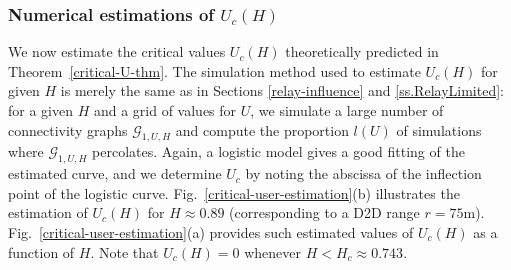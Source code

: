 \documentclass[conference]{IEEEtran}
\begin{document}
\vspace{1\baselineskip}

\subsubsection{Numerical estimations of $U_c(H)$}
We now estimate the critical values $U_c(H)$ theoretically predicted in Theorem~\ref{critical-U-thm}.
The simulation method used to estimate $U_{c}(H)$ for given $H$ is merely the same as in Sections \ref{relay-influence} and \ref{ss.RelayLimited}: for a given $H$ and a grid of values for $U$, we simulate a large number of connectivity graphs $\mathcal{G}_{1,U,H}$ and compute the proportion $l(U)$ of simulations where $\mathcal{G}_{1,U,H}$ percolates. Again, a logistic model gives a good fitting of the estimated curve, and we determine $U_{c}$ by noting the abscissa of the inflection point of the logistic curve. Fig.~\ref{critical-user-estimation}(b) illustrates the estimation of $U_c(H)$ for $H \approx 0.89$ (corresponding to a D2D range $r = 75 \text{m}$). Fig.~\ref{critical-user-estimation}(a) provides such estimated values of $U_c(H)$ as a function of $H$.
Note that $U_c(H) = 0$ whenever $H < H_c \approx 0.743$. %
\end{document}
